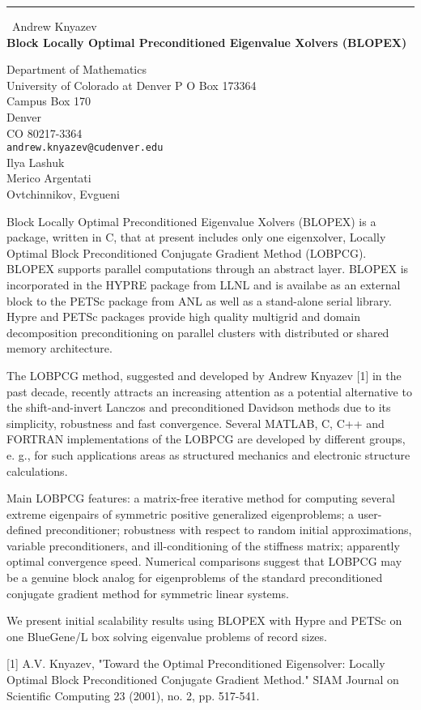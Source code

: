 \documentclass{report}
\begin{document}
\begin{center}
\rule{6in}{1pt} \
{\large Andrew Knyazev \\
{\bf Block Locally Optimal Preconditioned Eigenvalue Xolvers (BLOPEX)}}

Department of Mathematics \\ University of Colorado at Denver P O Box 173364 \\ Campus Box 170 \\ Denver \\ CO 80217-3364
\\
{\tt andrew.knyazev@cudenver.edu}\\
Ilya Lashuk\\
Merico Argentati\\
	Ovtchinnikov, Evgueni\end{center}

Block Locally Optimal Preconditioned Eigenvalue Xolvers (BLOPEX) is a
package, written in C, that at present includes only one eigenxolver,
Locally Optimal Block Preconditioned Conjugate Gradient Method (LOBPCG).
BLOPEX supports parallel computations through an abstract layer. BLOPEX
is incorporated in the HYPRE package from LLNL and is availabe as an
external block to the PETSc package from ANL as well as a stand-alone
serial library. Hypre and PETSc packages provide high quality multigrid
and domain decomposition preconditioning on parallel clusters with
distributed or shared memory architecture.

The LOBPCG method, suggested and developed by Andrew Knyazev [1] in the
past decade, recently attracts an increasing attention as a potential
alternative to the shift-and-invert Lanczos and preconditioned Davidson
methods due to its simplicity, robustness and fast convergence. Several
MATLAB, C, C++ and FORTRAN implementations of the LOBPCG are developed by
different groups, e. g., for such applications areas as structured
mechanics and electronic structure calculations.

Main LOBPCG features: a matrix-free iterative method for computing
several extreme eigenpairs of symmetric positive generalized
eigenproblems; a user-defined preconditioner; robustness with respect to
random initial approximations, variable preconditioners, and
ill-conditioning of the stiffness matrix; apparently optimal convergence
speed. Numerical comparisons suggest that LOBPCG may be a genuine block
analog for eigenproblems of the standard preconditioned conjugate
gradient method for symmetric linear systems.

We present initial scalability results using BLOPEX with Hypre and PETSc
on one BlueGene/L box solving eigenvalue problems of record sizes.

[1] A.V. Knyazev, "Toward the Optimal Preconditioned Eigensolver: Locally
Optimal Block Preconditioned Conjugate Gradient Method." SIAM Journal on
Scientific Computing 23 (2001), no. 2, pp. 517-541.
\end{document}
